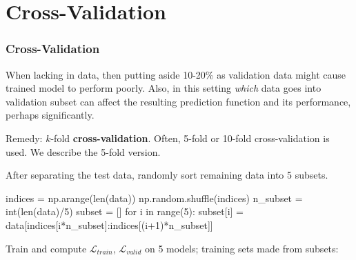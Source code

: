 \documentclass[smaller]{beamer}
\newenvironment{codeblock}
    {\hfill\begin{beamerboxesrounded}[lower=codecol, width=0.8\textwidth]
    \medskip

    }
    { 
    \end{beamerboxesrounded}\hfill
    }
\theoremstyle{example}
\begin{document}
\section{Cross-Validation}

\begin{frame}[fragile]
    \frametitle{Cross-Validation}
    When lacking in data, then putting aside 10-20\% as validation data might cause trained model to perform poorly. Also, in this setting \textit{which} data goes into validation subset can affect the resulting prediction function and its performance, perhaps significantly.
    
    \pause
    Remedy: $k$-fold \textbf{cross-validation}. Often, 5-fold or 10-fold cross-validation is used. We describe the 5-fold version. 

    \pause
    After separating the test data, randomly sort remaining data into 5 subsets.

\begin{codeblock}

\begin{python}
indices = np.arange(len(data))
np.random.shuffle(indices)
n_subset = int(len(data)/5)
subset = []
for i in range(5):
    subset[i] = data[indices[i*n_subset]:indices[(i+1)*n_subset]]
\end{python}

\end{codeblock}

\pause
Train and compute $\mathcal L_{train}$, $\mathcal L_{valid}$ on 5 models; training sets made from subsets:


\end{frame}
\end{document}

